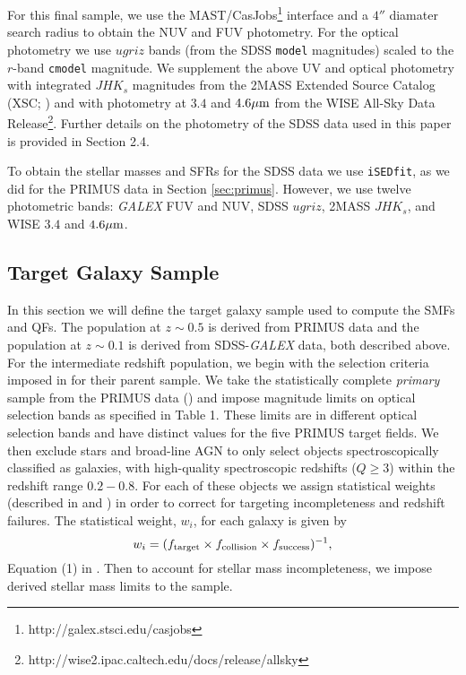 \documentclass{emulateapj}
\begin{document}
For this final sample, we use the MAST/CasJobs\footnote{http://galex.stsci.edu/casjobs} interface and a $4''$ diamater search radius to obtain the NUV and FUV photometry. 
For the optical photometry we use $ugriz$ bands (from the SDSS \texttt{model} magnitudes) scaled to the $r$-band \texttt{cmodel} magnitude. 
We supplement the above UV and optical photometry with integrated $JHK_s$ magnitudes from the 2MASS Extended Source Catalog (XSC; \cite{Jarrett:2000aa}) and with photometry at $3.4$ 
and $4.6 \mu \rm{m}$ from the WISE All-Sky Data Release\footnote{http://wise2.ipac.caltech.edu/docs/release/allsky}. 
Further details on the photometry of the SDSS data used in this paper is provided in \cite{Moustakas:2013aa} Section 2.4. 

To obtain the stellar masses and SFRs for the SDSS data we use \texttt{iSEDfit}, as we did for the PRIMUS data in Section \ref{sec:primus}.  
However, we use twelve photometric bands: {\em GALEX} FUV and NUV, SDSS $ugriz$, 2MASS $JHK_{s}$, and WISE $3.4$ and $4.6 \mu \rm{m}$.

\subsection{Target Galaxy Sample} \label{sec:target} 
In this section we will define the target galaxy sample 
used to compute the SMFs and QFs. The population 
at $z \sim 0.5$ is derived from PRIMUS data and the 
population at $z \sim 0.1$ is derived from SDSS-{\em GALEX} 
data, both described above. For the intermediate redshift 
population, we begin with the selection criteria imposed 
in \cite{Moustakas:2013aa} for their parent sample. We 
take the statistically complete {\em primary} sample from 
the PRIMUS data (\cite{Coil:2011aa}) and impose magnitude 
limits on optical selection bands as specified in 
\cite{Moustakas:2013aa} Table 1. These limits are in different 
optical selection bands and have distinct values for the 
five PRIMUS target fields. We then exclude stars and 
broad-line AGN to only select objects spectroscopically 
classified as galaxies, with high-quality spectroscopic redshifts 
($Q \geq 3$) within the redshift range $0.2 - 0.8$. For 
each of these objects we assign statistical weights (described 
in \cite{Coil:2011aa} and \cite{Cool:2013aa}) in order to correct 
for targeting incompleteness and redshift failures. The 
statistical weight, $w_i$, for each galaxy is given by
\begin{equation}
w_{i} = (f_{\rm{target}} \times f_{\rm{collision}} \times f_{\rm{success}})^{-1},
\end{equation}
Equation (1) in \cite{Moustakas:2013aa}. Then to account 
for stellar mass incompleteness, we impose derived stellar 
mass limits to the sample. 
\end{document}

